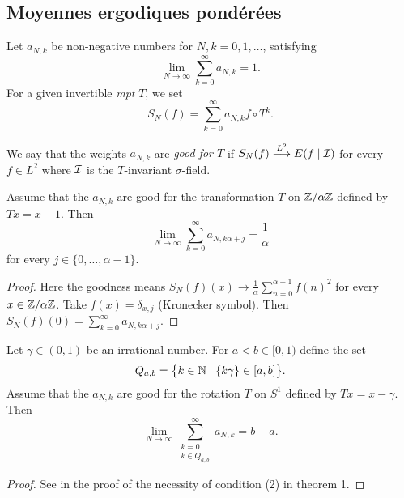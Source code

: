 \documentclass[12pt,a4paper]{article}
\begin{document}
\begin{appendices}

\section{Moyennes ergodiques pondérées}\label{sec:HP}

%

Let $a_{N,k}$ be non-negative numbers for $N,k = 0, 1, \ldots$, satisfying 
$$
\lim_{N \to \infty} \sum_{k=0}^\infty a_{N,k} =1. 
$$
For a given invertible \emph{mpt} $T$, we set
$$
S_N(f) = \sum_{k=0}^\infty a_{N,k} f \circ T^k.
$$

We say that the weights $a_{N,k}$ are \emph{good for $T$} if 
$S_N(f) \overset{L^2}{\longrightarrow} E(f \mid \mathcal{I})$ for every 
$f \in L^2$ where $\mathcal{I}$ is the $T$-invariant $\sigma$-field. 

\begin{lemma}
Assume that the $a_{N,k}$ are good for the transformation 
 $T$ on $\mathbb{Z}/\alpha\mathbb{Z}$ defined by $Tx = x - 1$. Then 
$$
\lim_{N \to \infty} \sum_{k=0}^\infty a_{N,k\alpha+j} = \frac{1}{\alpha}
$$
for every $j \in \{0, \ldots, \alpha-1\}$. 
\end{lemma}

\begin{proof}
Here the goodness means $S_N(f)(x) \to \frac{1}{\alpha} \sum_{n=0}^{\alpha-1} {f(n)}^2$ for 
every $x \in \mathbb{Z}/\alpha\mathbb{Z}$. 
Take $f(x) = \delta_{x,j}$ (Kronecker symbol). 
Then $S_N(f)(0) = \sum_{k=0}^\infty a_{N,k\alpha+j}$.
\end{proof}


\begin{lemma}
Let $\gamma \in (0,1)$ be an irrational number. For $a < b \in [0,1)$ define the set  
$$
Q_{a,b} = \bigl\{k \in \mathbb{N} \mid \{k\gamma\} \in [a,b] \bigr\}.  
$$
Assume that the $a_{N,k}$ are good for the rotation  
 $T$ on $S^1$ defined by $Tx = x - \gamma$. 
 Then 
$$
\lim_{N \to \infty} \sum_{\substack{k=0 \\ k \in Q_{a,b}}}^\infty a_{N,k} = b-a.
$$
\end{lemma}


\begin{proof}
See in \cite{HP} the proof of the necessity of condition (2) in theorem 1.
\end{proof}

\end{appendices}
\end{document}
